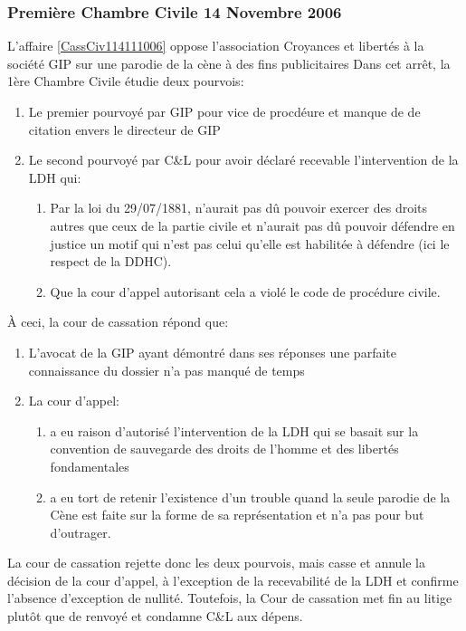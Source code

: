 \documentclass[math]{cours}
\begin{document}
\subsubsection{Première Chambre Civile 14 Novembre 2006}
L'affaire \ref{CassCiv114111006} oppose l'association Croyances et libertés à la société GIP sur une parodie de la cène à des fins publicitaires
Dans cet arrêt, la 1ère Chambre Civile étudie deux pourvois:
\begin{enumerate}
	\item Le premier pourvoyé par GIP pour vice de procdéure et manque de de citation envers le directeur de GIP
	\item Le second pourvoyé par C\&L pour avoir déclaré recevable l'intervention de la LDH qui:
		\begin{enumerate}
			\item Par la loi du 29/07/1881, n'aurait pas dû pouvoir exercer des droits autres que ceux de la partie civile et n'aurait pas dû pouvoir défendre en justice un motif qui n'est pas celui qu'elle est habilitée à défendre (ici le respect de la DDHC).
			\item Que la cour d'appel autorisant cela a violé le code de procédure civile.
		\end{enumerate}
\end{enumerate}
À ceci, la cour de cassation répond que:
\begin{enumerate}
	\item L'avocat de la GIP ayant démontré dans ses réponses une parfaite connaissance du dossier n'a pas manqué de temps
	\item La cour d'appel:
		\begin{enumerate}
			\item a eu raison d'autorisé l'intervention de la LDH qui se basait sur la convention de sauvegarde des droits de l'homme et des libertés fondamentales
			\item a eu tort de retenir l'existence d'un trouble quand la seule parodie de la Cène est faite sur la forme de sa représentation et n'a pas pour but d'outrager.
		\end{enumerate}
\end{enumerate}
La cour de cassation rejette donc les deux pourvois, mais casse et annule la décision de la cour d'appel, à l'exception de la recevabilité de la LDH et confirme l'absence d'exception de nullité.
Toutefois, la Cour de cassation met fin au litige plutôt que de renvoyé et condamne C\&L aux dépens.

\medskip
\end{document}
